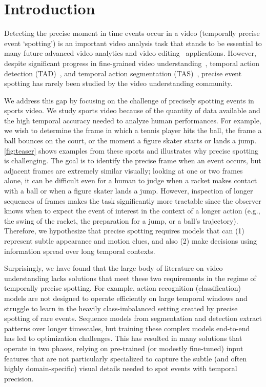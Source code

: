 \documentclass[runningheads]{llncs}
\begin{document}
\section{Introduction}

Detecting the precise moment in time events occur in a video (temporally precise
event `spotting') is an important video analysis task that stands to be essential to many future advanced video analytics and video editing~\cite{vid2player} applications.
However, despite significant progress in fine-grained video
understanding~\cite{epickitchens,kinetics,finegym,ssv2}, temporal action
detection (TAD)~\cite{activitynet,toyotasmarthome,thumos14,charades,multithumos}, and temporal action segmentation (TAS)~\cite{gtea,breakfast,50salads}, precise event spotting has rarely been studied by the video understanding community.

We address this gap by focusing on the challenge of precisely spotting events in sports video.
We study sports video because of the quantity
of data available and the high temporal accuracy needed to analyze human performances.
For example, we wish to determine the frame in which a tennis player hits
the ball, the frame a ball bounces on the court, or the moment a figure skater starts
or lands a jump.
\autoref{fig:teaser} shows examples from these sports and illustrates why precise spotting is challenging.
The goal is to identify the precise frame when an event occurs, but adjacent frames are extremely similar visually;
looking at one or two frames alone, it can be difficult even for a human to judge when a racket makes contact with a ball or when a figure skater lands a jump.
However, inspection of longer sequences of frames makes the
task significantly more tractable since the observer knows when to expect the
event of interest in the context of a longer action (e.g., the swing of the racket, the preparation for a jump, or a ball's trajectory).
Therefore, we hypothesize that precise spotting requires models that can (1) represent subtle appearance and motion clues, and also (2) make decisions using information spread over long temporal contexts.

Surprisingly, we have found that the large body of literature on video
understanding lacks solutions that meet these two requirements in the regime of temporally precise spotting.
For example, action recognition (classification) models are not designed to operate efficiently on large temporal windows and struggle to learn in the heavily class-imbalanced setting created by precise spotting of rare events.
Sequence models from segmentation and detection extract patterns over longer timescales, but training these complex models end-to-end has led to optimization challenges.
This has resulted in many solutions that operate in two phases, relying on pre-trained (or modestly fine-tuned) input features that are not particularly specialized to capture the subtle (and often highly domain-specific) visual details needed to spot events with temporal precision.
\end{document}
